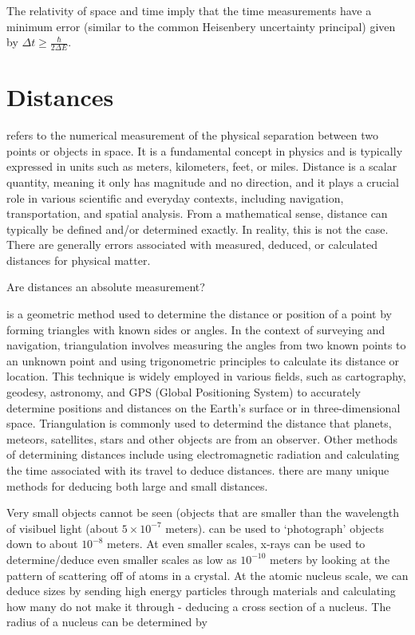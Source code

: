 The relativity of space and time imply that the time measurements have a minimum error (similar to the common Heisenbery uncertainty principal) given by $\Delta t \geq \frac{\hbar}{2 \Delta E}$.


\section{Distances}

 refers to the numerical measurement of the physical separation between two points or objects in space. It is a fundamental concept in physics and is typically expressed in units such as meters, kilometers, feet, or miles. Distance is a scalar quantity, meaning it only has magnitude and no direction, and it plays a crucial role in various scientific and everyday contexts, including navigation, transportation, and spatial analysis. From a mathematical sense, distance can typically be defined and/or determined exactly. In reality, this is not the case. There are generally errors associated with measured, deduced, or calculated distances for physical matter.  

\begin{questions}
	\item Are distances an absolute measurement?
\end{questions}

 is a geometric method used to determine the distance or position of a point by forming triangles with known sides or angles. In the context of surveying and navigation, triangulation involves measuring the angles from two known points to an unknown point and using trigonometric principles to calculate its distance or location. This technique is widely employed in various fields, such as cartography, geodesy, astronomy, and GPS (Global Positioning System) to accurately determine positions and distances on the Earth's surface or in three-dimensional space. Triangulation is commonly used to determind the distance that planets, meteors, satellites, stars and other objects are from an observer. Other methods of determining distances include using electromagnetic radiation and calculating the time associated with its travel to deduce distances. there are many unique methods for deducing both large and small distances.

Very small objects cannot be seen (objects that are smaller than the wavelength of visibuel light (about $5 \times 10^{-7}$ meters).  can be used to `photograph' objects down to about $10^{-8}$ meters. At even smaller scales, x-rays can be used to determine/deduce even smaller scales as low as $10^{-10}$ meters by looking at the pattern of scattering off of atoms in a crystal. At the atomic nucleus scale, we can deduce sizes by sending high energy particles through materials and calculating how many do not make it through - deducing a cross section of a nucleus. The radius of a nucleus can be determined by

